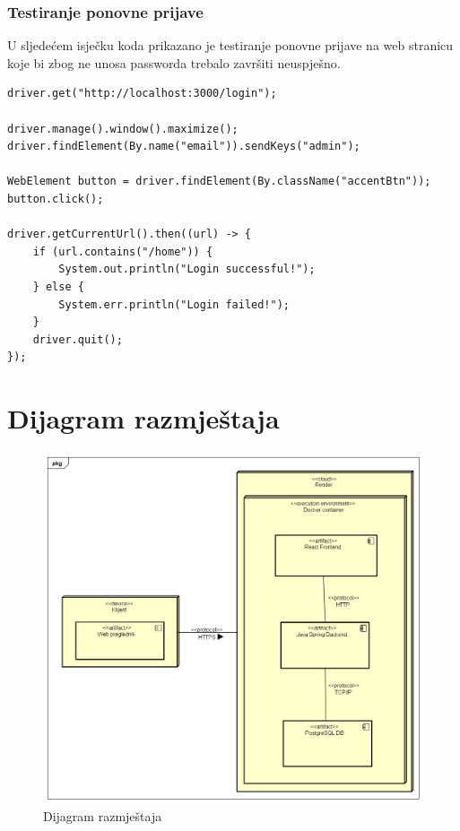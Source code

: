 			\subsubsection{Testiranje ponovne prijave}

			U sljedećem isječku koda prikazano je testiranje ponovne prijave na web stranicu koje bi zbog ne unosa passworda trebalo završiti neuspješno.

			\begin{lstlisting}
driver.get("http://localhost:3000/login");

driver.manage().window().maximize();
driver.findElement(By.name("email")).sendKeys("admin");

WebElement button = driver.findElement(By.className("accentBtn"));
button.click();

driver.getCurrentUrl().then((url) -> {
	if (url.contains("/home")) {
		System.out.println("Login successful!");
	} else {
		System.err.println("Login failed!");
	}
	driver.quit();        
});
			\end{lstlisting}


		
		
		\section{Dijagram razmještaja}
			
			
			 
			 \begin{figure}[H]
			 	\includegraphics[width=\textwidth]{slike/DeploymentDiagram.PNG}
			 	\caption{Dijagram razmještaja}
			 	\label{fig:deploymentDiagram}
			 \end{figure}
			 

